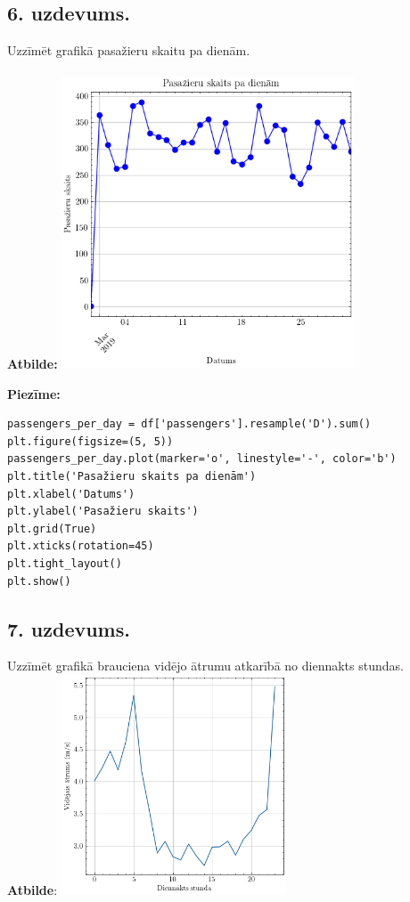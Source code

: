 \documentclass[12pt]{article}
\begin{document}
\subsection*{6. uzdevums.} Uzzīmēt grafikā pasažieru skaitu pa dienām.\\
\\
\noindent \textbf{Atbilde:} \includegraphics[width=0.65\textwidth]{6.uzd2.png}

\noindent \textbf{Piezīme:}
\begin{verbatim}
passengers_per_day = df['passengers'].resample('D').sum()
plt.figure(figsize=(5, 5))
passengers_per_day.plot(marker='o', linestyle='-', color='b')
plt.title('Pasažieru skaits pa dienām')
plt.xlabel('Datums')
plt.ylabel('Pasažieru skaits')
plt.grid(True)
plt.xticks(rotation=45)
plt.tight_layout()
plt.show()
\end{verbatim}
\subsection*{7. uzdevums.} Uzzīmēt grafikā brauciena vidējo ātrumu atkarībā no diennakts stundas.\\

\noindent \textbf{Atbilde}: \includegraphics[width=0.5\textwidth]{7.uzd.png}
\end{document}
